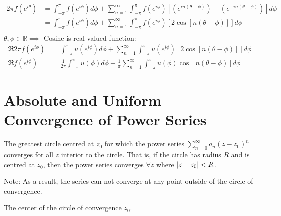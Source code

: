 \documentclass[12pt, english]{book}
\makeatletter
\renewenvironment{proof}[1][\proofname]{\par
	\pushQED{\qed}%
	\normalfont \topsep6\p@\@plus6\p@\relax
	\list{}{%
		\settowidth{\leftmargin}{\itshape\proofname:\hskip\labelsep}%
		\setlength{\labelwidth}{0pt}%
		\setlength{\itemindent}{-\leftmargin}%
	}%
	\item[\hskip\labelsep\itshape#1\@addpunct{:}]\ignorespaces
	}{ \popQED\endlist\@endpefalse}
\makeatother
\begin{document}
\begin{example}
\begin{proof}
{			\begin{align*}
				2\pi f(e^{i\theta})
				&= \int_{-\pi}^{\pi} f(e^{i\phi}) d\phi + \sum_{n=1}^{\infty} 
				\int_{-\pi}^{\pi} f(e^{i\phi}) 
				\left[ \left( e^{in(\theta-\phi)} \right)
				+  \left(e^{-in(\theta-\phi)} \right)  \right] d\phi \\
				&= \int_{-\pi}^{\pi} f(e^{i\phi}) d\phi + \sum_{n=1}^{\infty} 
				\int_{-\pi}^{\pi} f(e^{i\phi}) 
				\left[ 2\cos[n(\theta-\phi)] \right] d\phi \\
			\end{align*}
			\(\theta,\phi \in \mathbb{R} \implies \) Cosine is real-valued function:
			\begin{align*}
				\Re{2\pi f(e^{i\phi})} 
				&= \int_{-\pi}^{\pi} u(e^{i\phi}) d\phi + \sum_{n=1}^{\infty} 
				\int_{-\pi}^{\pi} u(e^{i\phi}) 
				\left[ 2\cos[n(\theta-\phi)] \right] d\phi \\
				\Re{f(e^{i\phi})} 
				&= \frac{1}{2\pi} \int_{-\pi}^{\pi} u(\phi) d\phi 
				 + \frac{1}{\pi} \sum_{n=1}^{\infty} \int_{-\pi}^{\pi} u(\phi) 
				 \cos[n(\theta-\phi)] d\phi
			\end{align*}
			}
		\end{proof}
	\end{example}
	
	\section{Absolute and Uniform Convergence of Power Series} \label{Absolute and Uniform Convergence of Power Series Section - Complex}
	
	\begin{definition}
		\label{Circle of Convergence Definition - Complex}
		The greatest circle centred at \(z_0\) for which the power series \(\sum_{n=0}^{\infty} a_n (z-z_0)^n\) converges for all \(z\) interior to the circle. That is, if the circle has radius \(R\) and is centred at \(z_0\), then the power series converges \(\forall z\) where \(\abs{z-z_0} < R\). 
	\end{definition}
	Note: As a result, the series can not converge at any point outside of the circle of convergence.
	
	\begin{definition}
		The center of the circle of convergence \(z_0\).
	\end{definition}
	
\end{document}

